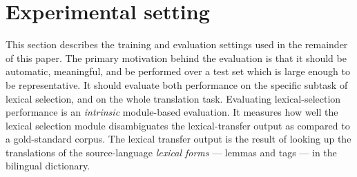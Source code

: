 \documentclass[11pt]{article}
\begin{document}
%   


\section{Experimental setting}

This section describes the training and evaluation settings used in
the remainder of this paper. The primary motivation behind the
evaluation is that it should be automatic, meaningful, and be performed over a test set which
is large enough to be representative. It should evaluate both
performance on the specific subtask of lexical selection, and on the
whole translation task. Evaluating lexical-selection performance is an
\emph{intrinsic} module-based evaluation.  It measures how well the lexical
selection module disambiguates the lexical-transfer
output as compared to a gold-standard corpus. The lexical 
transfer output is the result of looking up the translations of the 
source-language \emph{lexical forms} --- lemmas and  %
tags --- in the bilingual dictionary.
\end{document}
